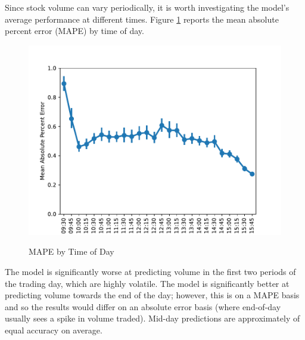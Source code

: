 \documentclass[12pt]{article}
\begin{document}
Since stock volume can vary periodically, it is worth investigating the model's average performance at different times. Figure \ref{fig:mape_by_time} reports the mean absolute percent error (MAPE) by time of day.
\begin{figure}[H]
    \centering
    \caption{MAPE by Time of Day}
    \includegraphics[width=0.75\linewidth]{../Output/mape_by_time.pdf}
    \label{fig:mape_by_time}
\end{figure}
The model is significantly worse at predicting volume in the first two periods of the trading day, which are highly volatile. The model is significantly better at predicting volume towards the end of the day; however, this is on a MAPE basis and so the results would differ on an absolute error basis (where end-of-day usually sees a spike in volume traded). Mid-day predictions are approximately of equal accuracy on average.
\end{document}
